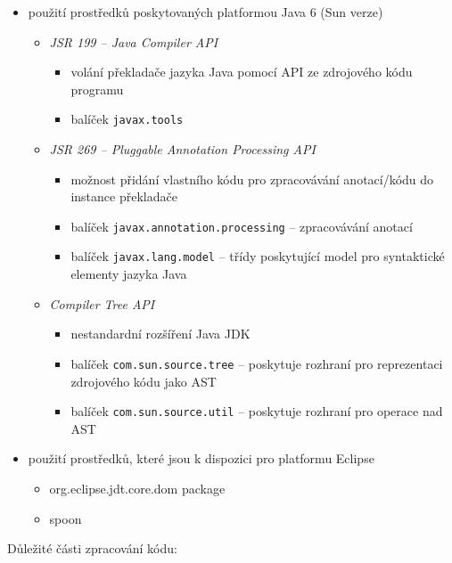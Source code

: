 \begin{itemize}
\item použití prostředků poskytovaných platformou Java 6 (Sun verze) \cite{source_code_analysis_corejavatechtips}
  \begin{itemize}
  \item \emph{JSR 199 -- Java Compiler API}
    \begin{itemize}
    \item volání překladače jazyka Java pomocí API ze zdrojového kódu programu
    \item balíček \verb+javax.tools+
    \end{itemize}
  \item \emph{JSR 269 -- Pluggable Annotation Processing API}
    \begin{itemize}
    \item možnost přidání vlastního kódu pro zpracovávání anotací/kódu do instance překladače
    \item balíček \verb+javax.annotation.processing+ -- zpracovávání anotací
    \item balíček \verb+javax.lang.model+ -- třídy poskytující model pro syntaktické elementy jazyka Java
    \end{itemize}
  \item \emph{Compiler Tree API} \cite{parsertools:compilertreeapi}
    \begin{itemize}
    \item nestandardní rozšíření Java JDK
    \item balíček \verb+com.sun.source.tree+ -- poskytuje rozhraní pro reprezentaci zdrojového kódu jako AST
    \item balíček \verb+com.sun.source.util+ -- poskytuje rozhraní pro operace nad AST
    \end{itemize}
  \end{itemize}
\item použití prostředků, které jsou k dispozici pro platformu Eclipse
  \begin{itemize}
  \item org.eclipse.jdt.core.dom package
  \item spoon \cite{parsertools:spoon}
  \end{itemize}
\end{itemize}


Důležité části zpracování kódu:

